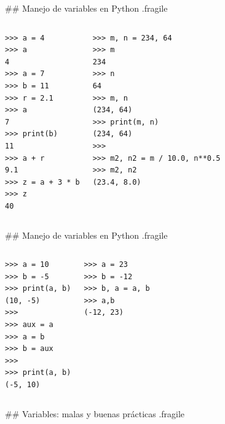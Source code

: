 ## Manejo de variables en Python {.fragile}

\begin{columns}[onlytextwidth,t]
\vspace{-2ex}

\begin{lstlisting}
>>> a = 4
>>> a
4
>>> a = 7
>>> b = 11
>>> r = 2.1
>>> a
7
>>> print(b)
11
>>> a + r
9.1
>>> z = a + 3 * b
>>> z
40
\end{lstlisting}

\vspace{-2ex}
\begin{lstlisting}
>>> m, n = 234, 64
>>> m
234
>>> n
64
>>> m, n
(234, 64)
>>> print(m, n)
(234, 64)
>>>
>>> m2, n2 = m / 10.0, n**0.5
>>> m2, n2
(23.4, 8.0)
\end{lstlisting}
\end{columns}

## Manejo de variables en Python {.fragile}

\begin{columns}[onlytextwidth,t]

\vspace{-2ex}
\begin{lstlisting}
>>> a = 10
>>> b = -5
>>> print(a, b)
(10, -5)
>>> 
>>> aux = a
>>> a = b
>>> b = aux
>>> 
>>> print(a, b)
(-5, 10)
\end{lstlisting}


\vspace{-2ex}
\begin{lstlisting}
>>> a = 23
>>> b = -12
>>> b, a = a, b
>>> a,b
(-12, 23)
\end{lstlisting}

\end{columns}

## Variables: malas y buenas prácticas {.fragile}

